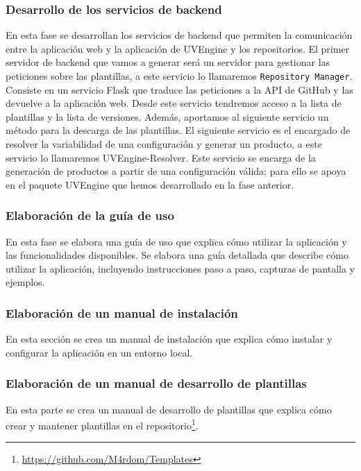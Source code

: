 \documentclass[12pt, a4paper, twoside]{article}
\begin{document}
\subsubsection{Desarrollo de los servicios de backend}
\label{sec:Desarrollo de los servicios de backend}
En esta fase se desarrollan los servicios de backend que permiten la comunicación entre la aplicación web y la aplicación de UVEngine y los repositorios.
El primer servidor de backend que vamos a generar será un servidor para gestionar las peticiones sobre las plantillas, a este servicio lo llamaremos \texttt{Repository Manager}. 
Consiste en un servicio Flask que traduce las peticiones a la API de GitHub y las devuelve a la aplicación web. Desde este servicio tendremos acceso a la lista de plantillas y la lista de versiones.
Además, aportamos al siguiente servicio un método para la descarga de las plantillas. El siguiente servicio es el encargado de resolver la variabilidad de una configuración y generar un producto, a este servicio lo llamaremos UVEngine-Resolver.
Este servicio se encarga de la generación de productos a partir de una configuración válida; para ello se apoya en el paquete UVEngine que hemos desarrollado en la fase anterior.

\subsubsection{Elaboración de la guía de uso}
En esta fase se elabora una guía de uso que explica cómo utilizar la aplicación y las funcionalidades disponibles.
Se elabora una guía detallada que describe cómo utilizar la aplicación, incluyendo instrucciones paso a paso, capturas 
de pantalla y ejemplos. 
\subsubsection{Elaboración de un manual de instalación}
En esta sección se crea un manual de instalación que explica cómo instalar y configurar la aplicación en un entorno local.
\subsubsection{Elaboración de un manual de desarrollo de plantillas}
En esta parte se crea un manual de desarrollo de plantillas que explica cómo crear y mantener plantillas en el repositorio\footnote{\href{https://github.com/M4rdom/Templates}{https://github.com/M4rdom/Templates}}.
\end{document}
